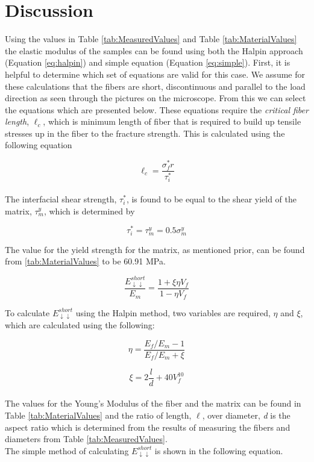 \documentclass[11pt]{article}
\begin{document}
\section{Discussion}

Using the values in Table \ref{tab:MeasuredValues} and Table \ref{tab:MaterialValues} the elastic modulus of the samples can be found using both the Halpin approach (Equation \ref{eq:halpin}) and simple equation (Equation \ref{eq:simple}). First, it is helpful to determine which set of equations are valid for this case. We assume for these calculations that the fibers are short, discontinuous and parallel to the load direction as seen through the pictures on the microscope. From this we can select the equations which are presented below. These equations require the \textit{critical fiber length}, \(\ell_c\), which is minimum length of fiber that is required to build up tensile stresses up in the fiber to the fracture strength. This is calculated using the following equation

\begin{equation}
\ell_c = \frac{\sigma^*_f r}{\tau^*_i}
\end{equation}
\\

The interfacial shear strength, \(\tau^*_i\), is found to be equal to the shear yield of the matrix, \(\tau^y_m\), which is determined by

\begin{equation}
\tau^*_i = \tau^y_m = 0.5 \sigma^y_m 
\end{equation}

The value for the yield strength for the matrix, as mentioned prior, can be found from \ref{tab:MaterialValues} to be 60.91 MPa.

\begin{equation} \label{eq:halpin}
\frac{E^{short}_{\downarrow \downarrow}}{E_m} = \frac{1+\xi \eta V_f}{1-\eta V_f}
\end{equation}

To calculate \(E_{\downarrow \downarrow}^{short}\) using the Halpin method, two variables are required, \(\eta\) and \(\xi\), which are calculated using the following:

\begin{equation}
\eta = \frac{E_f/E_m-1}{E_f/E_m+\xi}
\end{equation}

\begin{equation}
\xi = 2 \frac{l}{d} +40V^{10}_f
\end{equation}
\\
The values for the Young's Modulus of the fiber and the matrix can be found in Table \ref{tab:MaterialValues} and the ratio of  length, \(\ell\), over diameter, \textit{d} is the aspect ratio which is determined from the results of measuring the fibers and diameters from Table \ref{tab:MeasuredValues}.
\\
The simple method of calculating \(E_{\downarrow \downarrow}^{short}\) is shown in the following equation.
\end{document}
